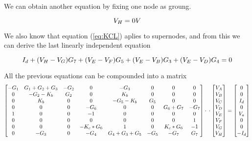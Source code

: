 We can obtain another equation by fixing one node as groung.

 \begin{equation}
    
  V_H = 0V\\
   
  \label{eq:supenodosGND}
\end{equation}

We also know that equation (\ref{eq:KCL}) aplies to supernodes, and from this we can derive the last linearly independent equation



 \begin{equation}
    
  I_d+(V_H-V_G)G_7+(V_E-V_F)G_5+(V_E-V_B)G_3+(V_E-V_D)G_4=0\\
   
  \label{eq:supenodosI}
\end{equation}

All the previous equations can be compounded into a matrix
  \begin{equation}\label{eq:matrixeqn2}
\begin{bmatrix}
    -G_1 & G_1+G_2+G_3 & -G_2 & 0 & -G_3 & 0 & 0 & 0\\
    0 & -G_2-K_b & G_2 & 0 & K_b & 0 & 0 & 0\\
    0 & K_b & 0 & 0 & -G_5-K_b & G_5 & 0 & 0\\
    0 & 0 & 0 & -G_6 & 0 & 0 & G_6+G_7 & -G_7\\
    1 & 0 & 0 & -1 & 0 & 0 & 0 & 0\\
    0 & 0 & 0 & 0 & 0 & 0 & 0 & 1\\
    0 & 0 & 0 & -K_c*G_6 & 1 & 0 & K_c*G_6 & -1\\
    0 & -G_3 & 0 & -G_4 & G_4+G_3+G_5 & -G_5 & -G_7 & G_7\\
\end{bmatrix}
\cdot

\\

\cdot
\begin{bmatrix}
V_A \\
V_B \\
V_C \\
V_D \\
V_E \\
V_F \\
V_G \\
V_H \\
    \end{bmatrix}
=
    \begin{bmatrix}
0 \\
0 \\
I_d \\
0\\
V_a \\
0 \\
0 \\
-I_d\\
    \end{bmatrix}
  \end{equation}

